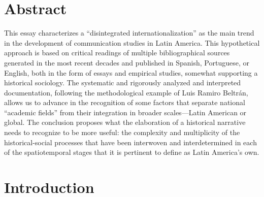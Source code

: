 \documentclass{tufte-handout}
\begin{document}
\begin{titlepage}
\begin{fullwidth}
\end{fullwidth}

\vspace*{5em}


\hypertarget{abstract}{%
\section{Abstract}\label{abstract}}

This essay characterizes a ``disintegrated internationalization'' as the
main trend in the development of communication studies in Latin America.
This hypothetical approach is based on critical readings of multiple
bibliographical sources generated in the most recent decades and
published in Spanish, Portuguese, or English, both in the form of essays
and empirical studies, somewhat supporting a historical sociology. The
systematic and rigorously analyzed and interpreted documentation,
following the methodological example of Luis Ramiro Beltrán, allows us
to advance in the recognition of some factors that separate national
``academic fields'' from their integration in broader scales---Latin
American or global. The conclusion proposes what the elaboration of a
historical narrative needs to recognize to be more useful: the
complexity and multiplicity of the historical-social processes that have
been interwoven and interdetermined in each of the spatiotemporal stages
that it is pertinent to define as Latin America's own.




 

\enlargethispage{2\baselineskip}

\vspace*{8em}



 \end{titlepage}


\hypertarget{introduction}{%
\section{Introduction}\label{introduction}}
\end{document}
